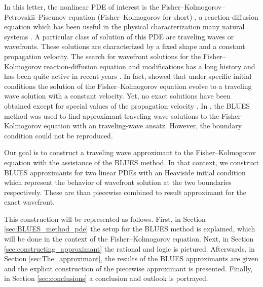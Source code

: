 \documentclass[amsmath,amssymb,amsfonts,aps,pre,preprint,superscriptaddress,bibnotes,showpacs,showkeys,longbibliography]{revtex4-1}
\begin{document}
In this letter, the nonlinear PDE of interest is the Fisher–Kolmogorov–Petrovskii–Piscunov equation (Fisher–Kolmogorov for short) \cite{fisher1937wave, kolmogorov1937study}, a reaction-diffusion equation which has been useful in the physical characterization many natural systems \cite{canosa1973nonlinear,ross2010generalized,hamel2011speedup, gueron1989model, Bewick2017Invasion}. %
A particular class of solution of this PDE are traveling waves or wavefronts. These solutions are characterized by a fixed shape and a constant propagation velocity. The search for wavefront solutions for the Fisher–Kolmogorov reaction-diffusion equation and modifications has a long history and has been quite active in recent years \cite{Mishra2012,Mansour2010,Yuan2013general}. %
In fact, \citet{kolmogorov1937study} showed that under specific initial conditions the solution of the Fisher–Kolmogorov equation evolve to a traveling wave solution with a constant velocity. Yet, no exact solutions have been obtained except for special values of the propagation velocity \cite{Ablowitz1979}. In \citet{Berx_2020}, the BLUES method was used to find approximant traveling wave solutions to the Fisher–Kolmogorov equation with an traveling-wave ansatz. However, the boundary condition could not be reproduced. %

Our goal is to construct a traveling wave approximant to the Fisher–Kolmogorov equation with the assistance of the BLUES method. In that context, we construct BLUES approximants for two linear PDEs with an Heaviside initial condition which represent the behavior of wavefront solution at the two boundaries respectively. These are than piecewise combined to result approximant for the exact wavefront.


This construction will be represented as follows. First, in Section \ref{sec:BLUES_method_pde} the setup for the BLUES method is explained, which will be done in the context of the Fisher–Kolmogorov equation. Next, in Section \ref{sec:constructing_approximant} the rational and logic is pictured. Afterwards, in Section \ref{sec:The_approximant}, the results of the BLUES approximants are given and the explicit construction of the piecewise approximant is presented. Finally, in Section \ref{sec:conclusions} a conclusion and outlook is portrayed.
\end{document}
